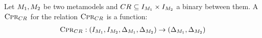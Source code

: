 
\begin{definition}[\ModelLevelConsistencyPreservationRule]
    \label{def:consistencypreservationrule}
    Let $M_{1}, M_{2}$ be two metamodels and $CR_{} \subseteq I_{M_{1}} \times I_{M_{2}}$ a binary \modellevelconsistencyrelation between them.
    A \emph{\modellevelconsistencypreservationrule} $\textsc{Cpr}_{CR_{}}$ for the relation $\textsc{Cpr}_{CR_{}}$ is a function:
    \begin{align*}
        \textsc{Cpr}_{CR_{}} : (I_{M_{1}}, I_{M_{2}}, \Delta_{M_{1}}, \Delta_{M_{2}}) \rightarrow (\Delta_{M_{1}}, \Delta_{M_{2}})
    \end{align*}
\end{definition}

